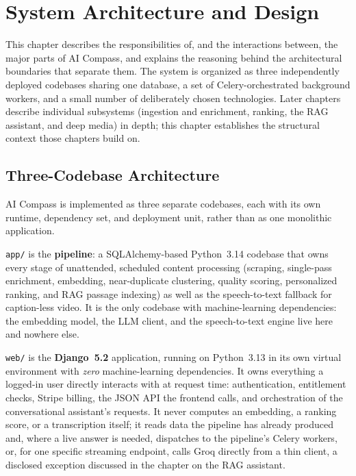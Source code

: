 \chapter{System Architecture and Design}
\label{chap:architecture}

This chapter describes the responsibilities of, and the interactions
between, the major parts of AI Compass, and explains the reasoning behind
the architectural boundaries that separate them. The system is organized as
three independently deployed codebases sharing one database, a set of
Celery-orchestrated background workers, and a small number of deliberately
chosen technologies. Later chapters describe individual subsystems
(ingestion and enrichment, ranking, the RAG assistant, and deep media) in
depth; this chapter establishes the structural context those chapters build
on.

\section{Three-Codebase Architecture}
\label{sec:arch-three-codebases}

AI Compass is implemented as three separate codebases, each with its own
runtime, dependency set, and deployment unit, rather than as one monolithic
application.

\texttt{app/} is the \textbf{pipeline}: a SQLAlchemy-based Python~3.14
codebase that owns every stage of unattended, scheduled content processing
(scraping, single-pass enrichment, embedding, near-duplicate clustering,
quality scoring, personalized ranking, and RAG passage indexing) as well as
the speech-to-text fallback for caption-less video. It is the only codebase
with machine-learning dependencies: the embedding model, the LLM client,
and the speech-to-text engine live here and nowhere else.

\texttt{web/} is the \textbf{Django~5.2} application, running on
Python~3.13 in its own virtual environment with \emph{zero}
machine-learning dependencies. It owns everything a logged-in user directly
interacts with at request time: authentication, entitlement checks, Stripe
billing, the JSON API the frontend calls, and orchestration of the
conversational assistant's requests. It never computes an embedding, a
ranking score, or a transcription itself; it reads data the pipeline has
already produced and, where a live answer is needed, dispatches to the
pipeline's Celery workers, or, for one specific streaming endpoint, calls
Groq directly from a thin client, a disclosed exception discussed in the
chapter on the RAG assistant.

